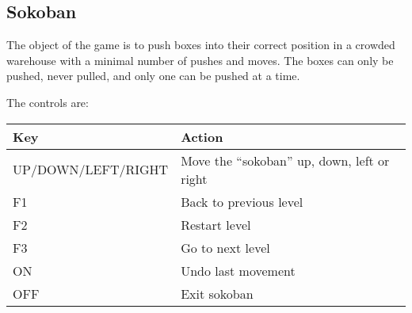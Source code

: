 \subsection{Sokoban}

The object of the game is to push boxes into their correct position in a
crowded warehouse with a minimal number of pushes and moves. The boxes
can only be pushed, never pulled, and only one can be pushed at a time.

The controls are:

\begin{table}[h!]
\begin{tabular}{@{}ll@{}}\toprule
\textbf{Key} & \textbf{Action} \\\midrule
UP/DOWN/LEFT/RIGHT & Move the ``sokoban'' up, down, left or right \\
F1 & Back to previous level \\
F2 & Restart level \\
F3 & Go to next level \\
ON & Undo last movement \\
OFF & Exit sokoban \\\bottomrule
\end{tabular}
\end{table}



